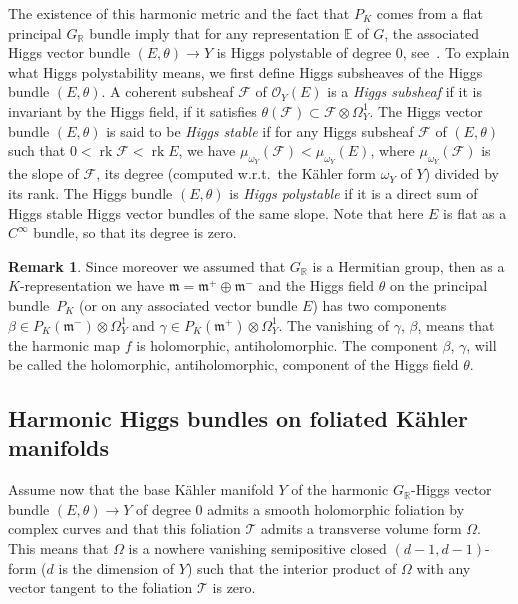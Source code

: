 \documentclass[JEP,XML,SOM,Unicode,NoFloatCountersInSection]{cedram}
\let\mathcal\mathscr
\theoremstyle{plain}
\theoremstyle{definition}
\newtheorem{rema}[theo]{Remark}
\DeclareMathOperator{\rk}{rk}
\newcommand{\cF}{\mathcal{F}}
\newcommand{\cO}{\mathcal{O}}
\newcommand{\cT}{\mathcal{T}}
\newcommand{\bE}{\mathbb{E}}
\newcommand{\bR}{\mathbb{R}}
\newcommand{\fm}{\mathfrak{m}}
\begin{document}
The existence of this harmonic metric and the fact that $P_K$ comes from a flat principal $G_\bR$ bundle imply
that for any representation $\bE$ of $G$, the associated Higgs vector bundle $(E,\theta)\to Y$ is Higgs
polystable of degree 0, see~\cite{S1}. To explain
what Higgs polystability means, we first define Higgs subsheaves of the Higgs bundle $(E,\theta)$.
A coherent subsheaf $\cF$ of $\cO_Y(E)$ is a \emph{Higgs subsheaf} if it is invariant by the Higgs
field, \ie if it satisfies
$\theta(\cF)\subset\cF\otimes\Omega^1_Y$. The Higgs vector bundle $(E,\theta)$ is said to be \emph{Higgs stable} if
for any Higgs subsheaf $\cF$ of $(E,\theta)$ such that $0<\rk\cF<\rk E$, we have
$\mu_{\omega_Y}(\cF)<\mu_{\omega_Y}(E)$, where $\mu_{\omega_Y}(\cF)$ is
the slope of $\cF$, \ie its degree (computed w.r.t.\ the Kähler form $\omega_Y$ of $Y$) divided by its rank. The
Higgs bundle $(E,\theta)$ is \emph{Higgs polystable} if it is a direct sum of Higgs stable Higgs vector bundles
of the same slope.
Note that here $E$ is flat as a $C^\infty$ bundle, so that its degree is zero.

\begin{rema}\label{rem:real}
Since moreover we assumed that $G_\bR$ is a Hermitian group, then as a $K$-representation we have
$\fm=\fm^+\oplus\fm^-$
and the Higgs field $\theta$ on the principal bundle~$P_K$ (or on any associated vector bundle $E$) has two
components \hbox{$\beta\in P_K(\fm^-)\otimes\Omega^1_Y$} and $\gamma\in P_K(\fm^+)\otimes\Omega^1_Y$. The
vanishing of $\gamma$, \resp $\beta$, means that the harmonic map $f$ is holomorphic, \resp antiholomorphic. The component $\beta$, \resp $\gamma$, will be called the holomorphic, \resp antiholomorphic, component of the Higgs field $\theta$.
\end{rema}

\subsection{Harmonic Higgs bundles on foliated Kähler manifolds}\label{subsec:HiggsFol}

Assume now that the base Kähler manifold $Y$ of the harmonic $G_\bR$-Higgs vector bundle
$(E,\theta)\to Y$ of degree $0$ admits a smooth holomorphic
foliation by complex curves and that this foliation $\cT$ admits a transverse volume form
$\Omega$. This means that $\Omega$ is a nowhere vanishing semipositive closed $(d-1,d-1)$-form ($d$ is the
dimension of $Y$) such that the interior product of $\Omega$ with any vector tangent to the
foliation $\cT$ is zero.
\end{document}
